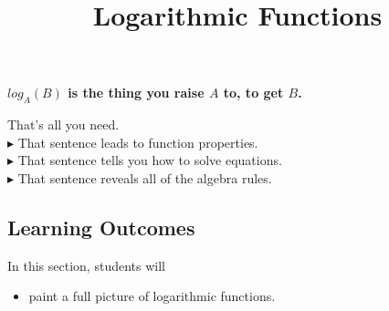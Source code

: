 \documentclass{ximera}
\title{Logarithmic Functions}
\begin{document}
\begin{abstract}
\end{abstract}
\maketitle





\begin{center}
\textbf{\textcolor{red!80!black}{$log_A(B)$ is the thing you raise $A$ to, to get $B$.}}
\end{center}


That's all you need. \\

\textbf{\textcolor{red!90!darkgray}{$\blacktriangleright$}} That sentence leads to function properties. \\

\textbf{\textcolor{red!90!darkgray}{$\blacktriangleright$}} That sentence tells you how to solve equations. \\

\textbf{\textcolor{red!90!darkgray}{$\blacktriangleright$}} That sentence reveals all of the algebra rules. \\










\subsection{Learning Outcomes}


\begin{sectionOutcomes}
In this section, students will 

\begin{itemize}
\item paint a full picture of logarithmic functions.
\end{itemize}
\end{sectionOutcomes}
\end{document}
